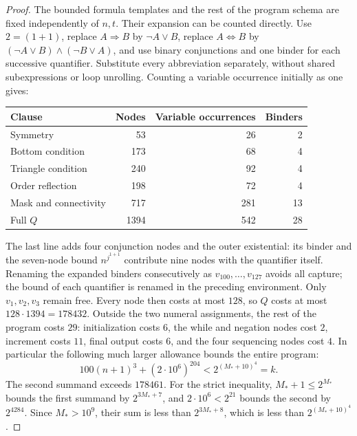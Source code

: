 \begin{proof}
The bounded formula templates and the rest of the program schema are
fixed independently of $n,t$.  Their expansion can be counted directly.
Use $2=(1+1)$, replace $A\Rightarrow B$ by $\neg A\lor B$, replace
$A\Leftrightarrow B$ by
$(\neg A\lor B)\land(\neg B\lor A)$, and use binary conjunctions
and one binder for each successive quantifier.  Substitute every
abbreviation separately, without shared subexpressions or loop
unrolling.  Counting a variable occurrence initially as one gives:
\begin{center}
\begin{tabular}{lrrr}
\toprule
Clause & Nodes & Variable occurrences & Binders\\
\midrule
Symmetry & 53 & 26 & 2\\
Bottom condition & 173 & 68 & 4\\
Triangle condition & 240 & 92 & 4\\
Order reflection & 198 & 72 & 4\\
Mask and connectivity & 717 & 281 & 13\\
\midrule
Full $Q$ & 1394 & 542 & 28\\
\bottomrule
\end{tabular}
\end{center}
The last line adds four conjunction nodes and the outer existential:
its binder and the seven-node bound $n^{j^{1+1}}$ contribute nine
nodes with the quantifier itself.  Renaming the expanded binders
consecutively as $v_{100},\ldots,v_{127}$ avoids all capture; the
bound of each quantifier is renamed in the preceding environment.
Only $v_1,v_2,v_3$ remain free.  Every node then costs at most $128$,
so $Q$ costs at most $128\cdot1394=178432$.
Outside the two numeral assignments, the rest of the program costs
$29$: initialization costs $6$, the while and negation nodes cost $2$,
increment costs $11$, final output costs $6$, and the four sequencing
nodes cost $4$.  In particular the following much larger allowance
bounds the entire program:
\begin{equation}\label{q:program-size}
 100(n+1)^3+(2\cdot10^6)^{204}
                      <2^{(M_*+10)^4}=k.
\end{equation}
The second summand exceeds $178461$.  For the strict inequality,
$M_*+1\le2^{M_*}$ bounds the first summand by $2^{3M_*+7}$,
and $2\cdot10^6<2^{21}$ bounds the second by $2^{4284}$.
Since $M_*>10^9$, their sum is less than $2^{3M_*+8}$, which
is less than $2^{(M_*+10)^4}$.

\end{proof}

